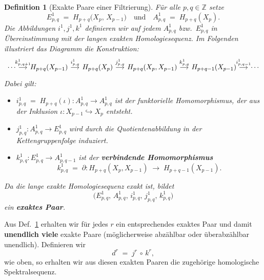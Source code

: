 \documentclass[12pt]{article}
\numberwithin{conj}{section}
\newtheorem{definition}[conj]{Definition}
\newcommand{\Z}{\mathbb{Z}}
\begin{document}
    \begin{definition}[Exakte Paare einer Filtrierung]
        \label{exaktFiltration} Für alle $p,q \in \Z$ setze
        \[
            E^{1}_{p,q}\;=\; H_{p+q}\bigl(X_{p},\,X_{p-1}\bigr) \quad\text{und}\quad A^{1}
            _{p,q}\;=\; H_{p+q}(X_{p}).
        \]
        Die Abbildungen $i^{1}, j^{1}, k^{1}$ definieren wir auf jedem $A^{1}_{p,q}$
        bzw.\ $E^{1}_{p,q}$ in Übereinstimmung mit der langen exakten
        Homologiesequenz. Im Folgenden illustriert das Diagramm die Konstruktion:
        \[\begin{tikzcd}[sep=small]
            \cdots & {H_{p+q}(X_{p-1})} & {H_{p+q}(X_{p})} & {H_{p+q}(X_{p},X_{p-1})} & {H_{p+q-1}(X_{p-1})} & \cdots
            \arrow["{k^1_{p,q+1}}", from=1-1, to=1-2]
            \arrow["{i^1_{p,q}}", from=1-2, to=1-3]
            \arrow["{j^1_{p,q}}", from=1-3, to=1-4]
            \arrow["{k^1_{p,q}}", from=1-4, to=1-5]
            \arrow["{i^1_{p,q-1}}", from=1-5, to=1-6]
        \end{tikzcd}\]
        Dabei gilt:
        \begin{itemize}[nolistsep]
            \item $i^{1}_{p,q}\;=\; H_{p+q}(\iota) : A^{1}_{p,q}\to A^{1}_{p,q}$ ist der
                funktorielle Homomorphismus, der aus der Inklusion
                $\iota: X_{p-1}\hookrightarrow X_{p}$ entsteht.

            \item $j^{1}_{p,q}: A^{1}_{p,q}\to E^{1}_{p,q}$ wird durch die Quotientenabbildung
                in der Kettengruppenfolge induziert.

            \item $k^{1}_{p,q}: E^{1}_{p,q}\to A^{1}_{p,q-1}$ ist der \textbf{verbindende
                Homomorphismus}
                \[
                    k^{1}_{p,q}\;=\; \partial : H_{p+q}(X_{p},X_{p-1}) \;\longrightarrow\;
                    H_{p+q-1}(X_{p-1}).
                \]
        \end{itemize}
        Da die lange exakte Homologiesequenz exakt ist, bildet
        \[
            \bigl( E^{1}_{p,q},\,A^{1}_{p,q},\,i^{1}_{p,q},\,j^{1}_{p,q},\,k^{1}_{p,q}\bigr
            )
        \]
        ein \textbf{exaktes Paar}.
    \end{definition}

    Aus Def.~\ref{exaktFiltration} erhalten wir für jedes $r$ ein
    entsprechendes exaktes Paar und damit \textbf{unendlich viele} exakte Paare (möglicherweise
    abzählbar oder überabzählbar unendlich). Definieren wir
    \[
        d^{r} \;=\; j^{r} \,\circ\, k^{r},
    \]
    wie oben, so erhalten wir aus diesen exakten Paaren die zugehörige homologische
    Spektralsequenz.
\end{document}
